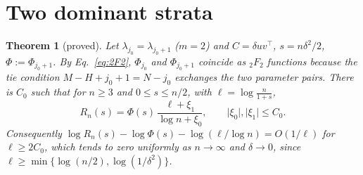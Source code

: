 \documentclass[11pt]{article}
\newcommand{\hypF}[2]{{}_{#1}F_{#2}}
\newtheorem{theorem}{Theorem}
\theoremstyle{remark}
\begin{document}
\section{Two dominant strata}

\begin{theorem}[proved]\label{thm:tie}
Let $\lambda_{j_0}=\lambda_{j_0+1}$ ($m=2$) and $C=\delta uv^\top$, $s=n\delta^2/2$, $\Phi:=\Phi_{j_0+1}$.
By Eq.~\eqref{eq:2F2}, $\Phi_{j_0}$ and $\Phi_{j_0+1}$ coincide as $\hypF22$ functions because the tie condition $M-H+j_0+1=N-j_0$ exchanges the two parameter pairs.
There is $C_0$ such that for $n\ge3$ and $0\le s\le n/2$, with $\ell=\log\frac n{1+s}$,
\begin{equation}
  R_n(s)=\Phi(s)\,\frac{\ell+\xi_1}{\log n+\xi_0},\qquad\lvert\xi_0\rvert,\lvert\xi_1\rvert\le C_0 .
  \label{eq:tie}
\end{equation}
Consequently $\log R_n(s)-\log\Phi(s)-\log(\ell/\log n)=O(1/\ell)$ for $\ell\ge2C_0$, which tends to zero uniformly as $n\to\infty$ and $\delta\to0$, since $\ell\ge\min\{\log(n/2),\log(1/\delta^2)\}$.
\end{theorem}
\end{document}
